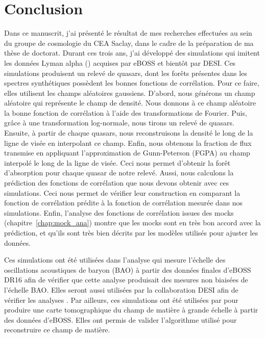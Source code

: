 % 

% 




\chapter{Conclusion}
\thispagestyle{fancy}

Dans ce manuscrit, j'ai présenté le résultat de mes recherches effectuées au sein du groupe de cosmologie du CEA Saclay, dans le cadre de la préparation de ma thèse de doctorat.
Durant ces trois ans, j'ai développé des simulations qui imitent les données Lyman alpha (\lya{}) acquises par eBOSS et bientôt par DESI.
Ces simulations produisent un relevé de quasars, dont les forêts \lya{} présentes dans les spectres synthétiques possèdent les bonnes fonctions de corrélation.
Pour ce faire, elles utilisent les champs aléatoires gaussiens. D'abord, nous générons un champ aléatoire qui représente le champ de densité. Nous donnons à ce champ aléatoire la bonne fonction de corrélation à l'aide des transformations de Fourier.
Puis, grâce à une transformation log-normale, nous tirons un relevé de quasars. Ensuite, à partir de chaque quasars, nous reconstruisons la densité le long de la ligne de visée en interpolant ce champ. Enfin, nous obtenons la fraction de flux transmise en appliquant l'approximation de Gunn-Peterson (FGPA) au champ interpolé le long de la ligne de visée.
Ceci nous permet d'obtenir la forêt d'absorption \lya{} pour chaque quasar de notre relevé.
Aussi, nous calculons la prédiction des fonctions de corrélation que nous devons obtenir avec ces simulations. Ceci nous permet de vérifier leur construction en comparant la fonction de corrélation prédite à la fonction de corrélation mesurée dans nos simulations.
Enfin, l'analyse des fonctions de corrélation issues des mocks (chapitre~\ref{chap:mock_ana}) montre que les mocks sont en très bon accord avec la prédiction, et qu'ils sont très bien décrits par les modèles utilisés pour ajuster les données.


Ces simulations ont été utilisées dans l'analyse qui mesure l'échelle des oscillations acoustiques de baryon (BAO) à partir des données finales d'eBOSS DR16 \autocite{DuMasdesBourboux2020} afin de vérifier que cette analyse produisait des mesures non biaisées de l'échelle BAO. Elles seront aussi utilisées par la collaboration DESI afin de vérifier les analyses \lya{}.
Par ailleurs, ces simulations ont été utilisées par \textcite{Ravoux2020} pour produire une carte tomographique du champ de matière à grande échelle à partir des données d'eBOSS. Elles ont permis de valider l'algorithme utilisé pour reconstruire ce champ de matière.


